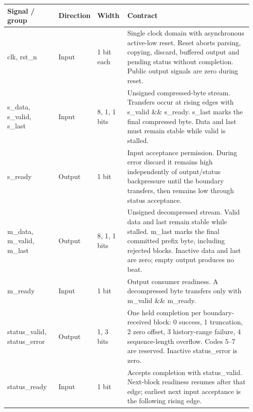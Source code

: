 \documentclass[11pt,a4paper]{article}
\begin{document}
{\small\renewcommand{\arraystretch}{1.18}\begin{longtable}{@{}L{0.21\textwidth}|L{0.12\textwidth}|L{0.12\textwidth}|L{0.45\textwidth}@{}}\toprule

\textbf{Signal /\allowbreak{} group} & \textbf{Direction} & \textbf{Width} & \textbf{Contract}\\\midrule\endhead

clk,\allowbreak{} rst\_\allowbreak{}n & Input & 1 bit each & Single clock domain with asynchronous active-low reset. Reset aborts parsing,\allowbreak{} copying,\allowbreak{} discard,\allowbreak{} buffered output and pending status without completion. Public output signals are zero during reset.\\[2pt]\hline

s\_\allowbreak{}data,\allowbreak{} s\_\allowbreak{}valid,\allowbreak{} s\_\allowbreak{}last & Input & 8,\allowbreak{} 1,\allowbreak{} 1 bits & Unsigned compressed-byte stream. Transfers occur at rising edges with s\_\allowbreak{}valid \&\& s\_\allowbreak{}ready. s\_\allowbreak{}last marks the final compressed byte. Data and last must remain stable while valid is stalled.\\[2pt]\hline

s\_\allowbreak{}ready & Output & 1 bit & Input acceptance permission. During error discard it remains high independently of output/\allowbreak{}status backpressure until the boundary transfers,\allowbreak{} then remains low through status acceptance.\\[2pt]\hline

m\_\allowbreak{}data,\allowbreak{} m\_\allowbreak{}valid,\allowbreak{} m\_\allowbreak{}last & Output & 8,\allowbreak{} 1,\allowbreak{} 1 bits & Unsigned decompressed stream. Valid data and last remain stable while stalled. m\_\allowbreak{}last marks the final committed prefix byte,\allowbreak{} including rejected blocks. Inactive data and last are zero; empty output produces no beat.\\[2pt]\hline

m\_\allowbreak{}ready & Input & 1 bit & Output consumer readiness. A decompressed byte transfers only with m\_\allowbreak{}valid \&\& m\_\allowbreak{}ready.\\[2pt]\hline

status\_\allowbreak{}valid,\allowbreak{} status\_\allowbreak{}error & Output & 1,\allowbreak{} 3 bits & One held completion per boundary-received block: 0 success,\allowbreak{} 1 truncation,\allowbreak{} 2 zero offset,\allowbreak{} 3 history-range failure,\allowbreak{} 4 sequence-length overflow. Codes 5–7 are reserved. Inactive status\_\allowbreak{}error is zero.\\[2pt]\hline

status\_\allowbreak{}ready & Input & 1 bit & Accepts completion with status\_\allowbreak{}valid. Next-block readiness resumes after that edge; earliest next input acceptance is the following rising edge.\\[2pt]\hline

\bottomrule\end{longtable}}
\end{document}
